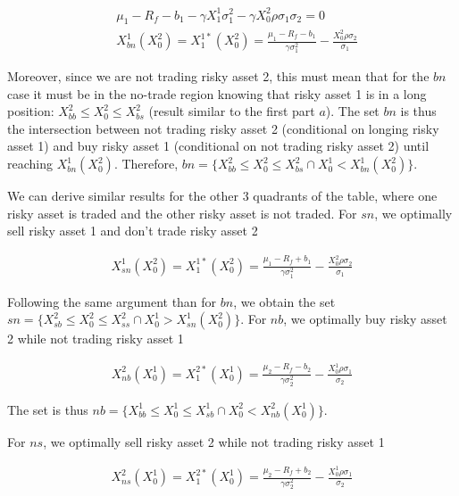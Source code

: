 \documentclass[10pt]{article}
\begin{document}
\begin{align*}
	& \mu_1 - R_f - b_1 - \gamma X_1^1\sigma_1^2 - \gamma X_0^2 \rho \sigma_1 \sigma_2 = 0	\\
	& X_{bn}^1(X_0^2) =  X_1^{1*}(X_0^2)  = \frac{\mu_1 - R_f - b_1}{\gamma \sigma_1^2} - \frac{X_0^2 \rho  \sigma_2}{\sigma_1}
\end{align*}

Moreover, since we are not trading risky asset 2, this must mean that for the  $bn$ case it must be in the no-trade region knowing that risky asset 1 is in a long position: $X_{bb}^2 \leq X_0^2 \leq X_{bs}^2$ (result similar to the first part $a$). The  set $bn $ is thus the intersection between not trading risky asset 2 (conditional on longing risky asset 1) and buy risky asset 1 (conditional on not trading risky asset 2) until reaching $X_{bn}^1(X_0^2)$. Therefore, $bn = \{ X_{bb}^2 \leq X_0^2 \leq X_{bs}^2 \cap X_0^1 < X_{bn}^1(X_0^2) \}$.

\bigbreak

We can derive similar results for the other 3 quadrants of the table, where one risky asset is traded and the other risky asset is not traded. For $sn$, we optimally sell risky asset 1 and don't trade risky asset 2

\begin{align*}
	X_{sn}^1(X_0^2) =  X_1^{1*}(X_0^2)  = \frac{\mu_1 - R_f + b_1}{\gamma \sigma_1^2} - \frac{X_0^2 \rho  \sigma_2}{\sigma_1}
\end{align*}

Following the same argument than for $bn$, we obtain the set $sn = \{ X_{sb}^2 \leq X_0^2 \leq X_{ss}^2 \cap X_0^1 > X_{sn}^1(X_0^2) \}$. For $nb$, we optimally buy risky asset 2 while not trading risky asset 1

\begin{align*}
	X_{nb}^2(X_0^1) =  X_1^{2*}(X_0^1)  = \frac{\mu_2 - R_f - b_2}{\gamma \sigma_2^2} - \frac{X_0^1 \rho  \sigma_1}{\sigma_2}
\end{align*}

The set is thus $nb = \{ X_{bb}^1 \leq X_0^1 \leq X_{sb}^1 \cap X_0^2 < X_{nb}^2(X_0^1) \}$.

For $ns$, we optimally sell risky asset 2 while not trading risky asset 1

\begin{align*}
	X_{ns}^2(X_0^1) =  X_1^{2*}(X_0^1)  = \frac{\mu_2 - R_f + b_2}{\gamma \sigma_2^2} - \frac{X_0^1 \rho  \sigma_1}{\sigma_2}
\end{align*}
\end{document}
